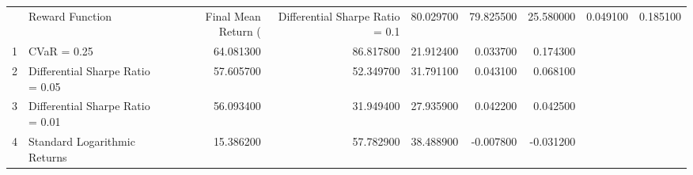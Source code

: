\begin{tabular}{llrrrrr}
\toprule
 & Reward Function & Final Mean Return (%
 & Differential Sharpe Ratio = 0.1 & 80.029700 & 79.825500 & 25.580000 & 0.049100 & 0.185100 \\
1 & CVaR = 0.25 & 64.081300 & 86.817800 & 21.912400 & 0.033700 & 0.174300 \\
2 & Differential Sharpe Ratio = 0.05 & 57.605700 & 52.349700 & 31.791100 & 0.043100 & 0.068100 \\
3 & Differential Sharpe Ratio = 0.01 & 56.093400 & 31.949400 & 27.935900 & 0.042200 & 0.042500 \\
4 & Standard Logarithmic Returns & 15.386200 & 57.782900 & 38.488900 & -0.007800 & -0.031200 \\
\bottomrule
\end{tabular}
